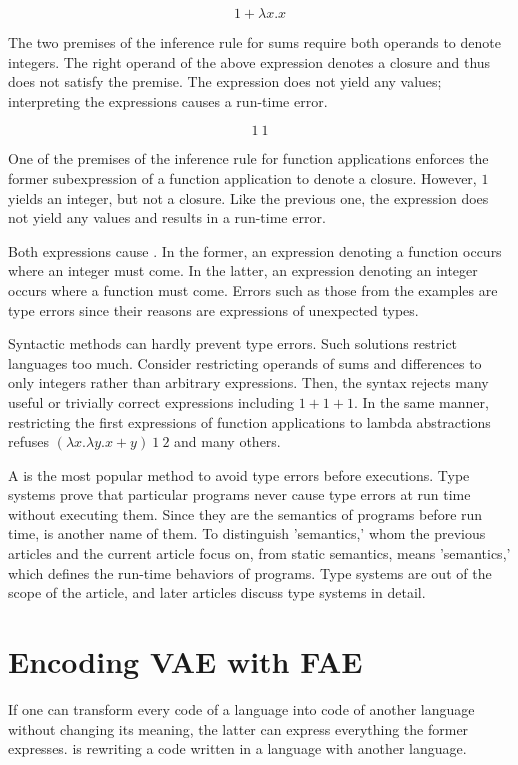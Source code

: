 \[1 + \lambda x.x\]

The two premises of the inference rule for sums require both operands to denote
integers. The right operand of the above expression denotes a closure and thus
does not satisfy the premise. The expression does not yield any values;
interpreting the expressions causes a run-time error.

\[1\ 1\]

One of the premises of the inference rule for function applications enforces the
former subexpression of a function application to denote a closure. However,
\(1\) yields an integer, but not a closure. Like the previous one, the expression
does not yield any values and results in a run-time error.

Both expressions cause . In the former, an expression denoting
a function occurs where an integer must come. In the latter, an expression
denoting an integer occurs where a function must come. Errors such as those from
the examples are type errors since their reasons are expressions of unexpected
types.

Syntactic methods can hardly prevent type errors. Such solutions restrict
languages too much. Consider restricting operands of sums and differences to only
integers rather than arbitrary expressions. Then, the syntax rejects many useful
or trivially correct expressions including \(1+1+1\). In the same manner,
restricting the first expressions of function applications to lambda abstractions
refuses \((\lambda x.\lambda y.x+y)\ 1\ 2\) and many others.

A  is the most popular method to avoid type errors before
executions. Type systems prove that particular programs never cause type errors
at run time without executing them. Since they are the semantics of programs
before run time,  is another name of them. To distinguish
'semantics,' whom the previous articles and the current article focus on, from
static semantics,  means 'semantics,' which defines the
run-time behaviors of programs. Type systems are out of the scope of the article,
and later articles discuss type systems in detail.

\section{Encoding VAE with FAE}

If one can transform every code of a language into code of another language
without changing its meaning, the latter can express everything the former
expresses.  is rewriting a code written in a language with another
language.

